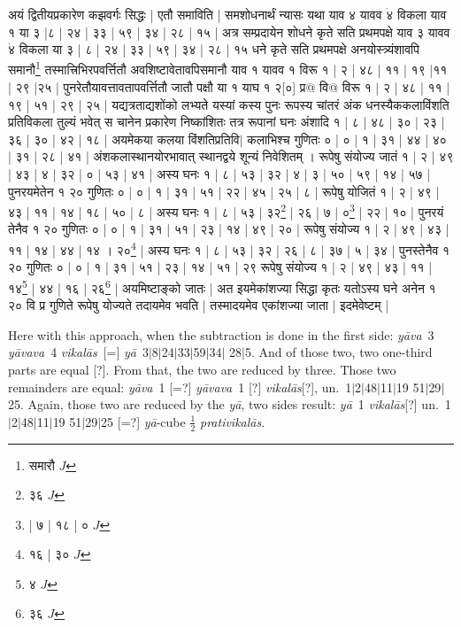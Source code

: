 \documentclass[12pt]{book}
\def\prativikalas{\textit{prati\-vi\-ka\-l\=as}}
\def\ya{\textit{y\=a}}
\def\yava{\textit{y\=ava}}
\def\yavava{\textit{y\=avava}}
\def\vikalas{\textit{vi\-ka\-l\=as}}
\def\danda{$|$}
\begin{document}
{\s अयं
द्वितीयप्रकारेण कझवर्गः सिद्धः | एतौ समाविति | समशोधनार्थं न्यासः
यथा याव ४ यावव $\dot{४}$ विकला याव १ या ३ |८ | २४ | ३३ | ५९ | ३४ | २८ | १५ | अत्र
सम्प्रदायेन शोधने कृते सति प्रथमपक्षे याव ३ यावव $\dot{४}$ विकला या ३ | ८ | २४ |
३३ | ५९ | ३४ | २८ | १५ धने कृते सति प्रथमपक्षे अनयोस्त्र्यंशावपि समानौ\footnote{{\s समारौ} $J$} 
तस्मात्त्रिभिरपवर्त्तितौ अवशिष्टावेतावपिसमानौ याव १ यावव १ विरू १ | २ | ४८ | ११ |
१९ |११ | २९ |२५ |
पुनरेतौयावत्तावतापवर्त्तितौ जातौ पक्षौ या १ याघ १ २[०] प्र@ वि@ विरू १ | २ | ४८ | ११ | १९ | ५१ | २९ | २५ |
यद्यत्रताद्यशोंको लभ्यते यस्यां कस्य पुनः रूपस्य चांतरं अंक धनस्यैककलाविंशति प्रतिविकला तुल्यं भवेत्
स चानेन प्रकारेण निष्कांशितः तत्र रूपानां घनः अंशादि १ | ८ | ४८ | ३० | २३ | ३६ | ३० | ४२ | १८ | अयमेकया कलया विंशतिप्रतिवि$|$ कलाभिश्च गुणितः ० | ० | १ | ३१ | ४४ | ४० | ३१ | २८ | ४१ | अंशकलास्थानयोरभावात् स्थानद्वये शून्यं निवेशितम् ।
रूपेषु संयोज्य जातं १ | २ | ४९ | ४३ | ४ | ३२ | ० | ५३ | ४१ | अस्य घनः १ | ८ | ५३ | ३२ | ४ | ३ | ५० | ५९ | १४ | ५७ | पुनरयमेतेन १ २० गुणितः ० | ० | १ | ३१ | ५१ | २२ | ४५ | २५ | ८ | रूपेषु योजितं १ | २ | ४९ | ४३ | ११ | १४ | १८ | ५० | ८ | अस्य घनः १ | ८ | ५३ | ३२\footnote{{\s ३६} $J$} | २६ | ७ | ०\footnote{{\s | ७ | १८ | ०} $J$} | २२ | १० | पुनरयं तेनैव १ २० गुणितः ० | ० | १ | ३१ | ५१ | २३ | १४ | ४९ | २० | रूपेषु संयोज्य १ | २ | ४९ | ४३ | ११ | १४ | ४४ | १४ । २०\footnote{{\s १६ | ३०} $J$} | अस्य घनः १ | ८ | ५३ | ३२ | २६ | ८ | ३७ | ५ | ३४ |  पुनस्तेनैव १ २० गुणितः ० | ० | १ | ३१ | ५१ | २३ | १४ | ५१ | २९
रूपेषु संयोज्य १ | २ | ४९ | ४३ | ११ | १४\footnote{{\s ४} $J$} | ४४ | १६ | २६\footnote{{\s ३६} $J$} | अयमिष्टाङ्को जातः | अत इयमेकांशज्या सिद्धा कृतः यतोऽस्य घने अनेन १ २० वि प्र
गुणिते रूपेषु योज्यते तदायमेव भवति | तस्मादयमेव
एकांशज्या जाता | इदमेवेष्टम् |}

\newpage

Here with this approach, when the subtraction is done in the first side:
\yava\ 3 \yavava\ 4 \vikalas\ [=] \ya\ 3\danda 8\danda 24\danda 33\danda 59\danda 34\danda
28\danda 5. And of those two, two one-third parts are equal [?]. 
From that, the two are reduced by three. Those two remainders are equal:
\yava\ 1 [=?] \yavava\ 1 [?] \vikalas [?], un.\ 1\danda 2\danda 48\danda 11\danda 19
51\danda 29\danda 25.
Again, those two are reduced by the \ya, two sides result: 
\ya\ 1 \vikalas [?] un.\  1\danda 2\danda 48\danda 11\danda 19
51\danda 29\danda 25 [=?] \ya-cube $\frac{1}{2}$ \prativikalas.
\end{document}
